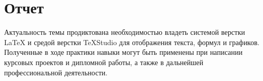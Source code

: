 \documentclass{article}
\begin{document}
\section{Отчет}
\begin{flushleft}
  
Актуальность темы продиктована необходимостью владеть системой верстки {\LaTeX} и средой верстки TeXStudio для отображения текста, формул и графиков. Полученные в ходе практики навыки могут быть применены при написании курсовых проектов и дипломной работы, а также в дальнейшей профессиональной деятельности.\\

\end{flushleft}
\newpage
\end{document}
